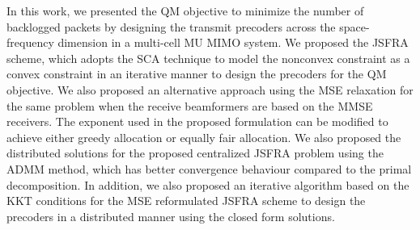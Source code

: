 
In this work, we presented the \acl{QM} objective to minimize the number of backlogged packets by designing the transmit precoders across the space-frequency dimension in a multi-cell \ac{MU} \ac{MIMO} system. We proposed the \ac{JSFRA} scheme, which adopts the \ac{SCA} technique to model the nonconvex constraint as a convex constraint in an iterative manner to design the precoders for the \acl{QM} objective. We also proposed an alternative approach using the \ac{MSE} relaxation for the same problem when the receive beamformers are based on the \ac{MMSE} receivers. The exponent used in the proposed formulation can be modified to achieve either greedy allocation or equally fair allocation. We also proposed the distributed solutions for the proposed centralized \ac{JSFRA} problem using the \ac{ADMM} method, which has better convergence behaviour compared to the primal decomposition. In addition, we also proposed an iterative algorithm based on the \ac{KKT} conditions for the \ac{MSE} reformulated \ac{JSFRA} scheme to design the precoders in a distributed manner using the closed form solutions.
